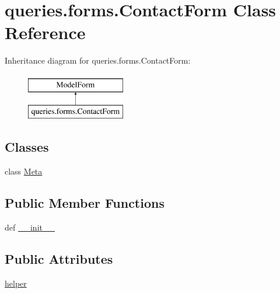 \hypertarget{classqueries_1_1forms_1_1_contact_form}{\section{queries.\-forms.\-Contact\-Form Class Reference}
\label{classqueries_1_1forms_1_1_contact_form}
}
Inheritance diagram for queries.\-forms.\-Contact\-Form\-:\begin{figure}[H]
\begin{center}
\leavevmode
\includegraphics[height=2.000000cm]{classqueries_1_1forms_1_1_contact_form}
\end{center}
\end{figure}
\subsection*{Classes}
\begin{DoxyCompactItemize}
\item 
class \hyperlink{classqueries_1_1forms_1_1_contact_form_1_1_meta}{Meta}
\end{DoxyCompactItemize}
\subsection*{Public Member Functions}
\begin{DoxyCompactItemize}
\item 
def \hyperlink{classqueries_1_1forms_1_1_contact_form_af2de7ebff0251794f4c85adaaac838c2}{\-\_\-\-\_\-init\-\_\-\-\_\-}
\end{DoxyCompactItemize}
\subsection*{Public Attributes}
\begin{DoxyCompactItemize}
\item 
\hyperlink{classqueries_1_1forms_1_1_contact_form_a55837993dfb70d91a1b3ae720f522e1d}{helper}
\end{DoxyCompactItemize}


